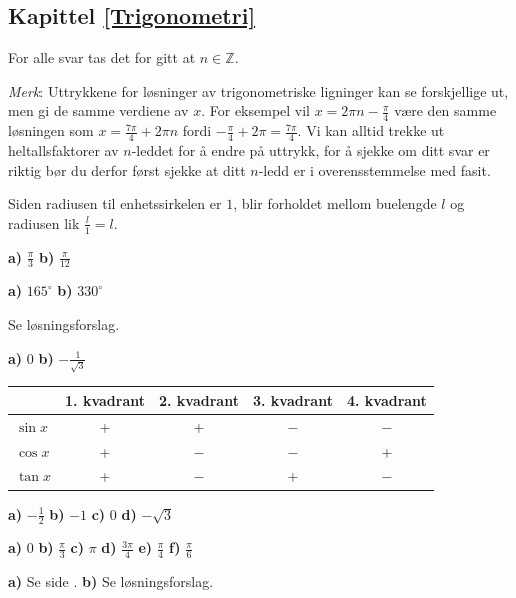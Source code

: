 

\usepackage{xr}



\subsection*{Kapittel \ref{Trigonometri}}	
\footnotesize
For alle svar tas det for gitt at $ n\in \mathbb{Z} $.

\textsl{Merk}: Uttrykkene for løsninger av trigonometriske ligninger kan se forskjellige ut, men gi de samme verdiene av $ x $. For eksempel vil $ {x= 2\pi n-\frac{\pi}{4}} $ være den samme løsningen som $ {x = \frac{7\pi}{4}+2\pi n} $ fordi $ {-\frac{\pi}{4}+2\pi = \frac{7\pi}{4}}$. Vi kan alltid trekke ut heltallsfaktorer av $ n $-leddet for å endre på uttrykk, for å sjekke om ditt svar er riktig bør du derfor først sjekke at ditt $ n $-ledd er i overensstemmelse med fasit.

Siden radiusen til enhetssirkelen er $ 1 $, blir forholdet mellom buelengde $ l $ og radiusen lik $ \frac{l}{1}=l $.

 \textbf{a)} $ \frac{\pi}{3} $ \textbf{b)} $ \frac{\pi}{12} $

 \textbf{a)} $ 165^\circ $ \textbf{b)} $ 330^\circ $

 Se løsningsforslag.

 \textbf{a)} $ 0  $ \textbf{b)} $- \frac{1}{\sqrt{3}} $
\newpage
{}\\
\begin{tabular}{@{}l|c| c| c|c|}
	
	&1. kvadrant & 2. kvadrant & 3. kvadrant & 4. kvadrant\\ \hline
	$ \sin x $& +& +& $ - $&$ - $\\ \hline
	$ \cos x $& +& $ - $& $ - $&+\\ \hline
	$ \tan x $& +& $ - $& +&$ - $\\\hline
\end{tabular}\vsk

\textbf{a)} $ -\frac{1}{2} $ \textbf{b)} $ -1 $ \textbf{c)} $ 0 $ \textbf{d)} $ -\sqrt{3} $

\textbf{a)} 0 \textbf{b)} $ \frac{\pi}{3} $ \textbf{c)} $ \pi $
\textbf{d)} $ \frac{3\pi}{4} $ \textbf{e)} $ \frac{\pi}{4} $ 
\textbf{f)} $ \frac{\pi}{6} $

 \sel

 \textbf{a)} Se side \pageref{sin2xbevis}. \textbf{b)} Se løsningsforslag.

